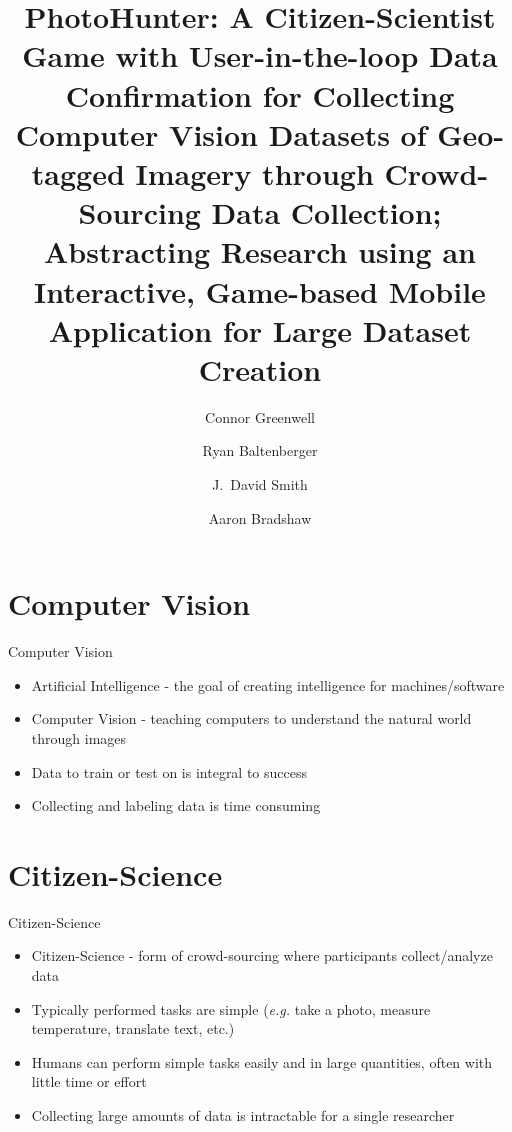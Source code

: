 \documentclass[aspectratio=169]{beamer}
\title[PhotoHunter]{PhotoHunter: A Citizen-Scientist Game with User-in-the-loop 
  Data Confirmation for Collecting Computer Vision Datasets of 
  Geo-tagged Imagery through Crowd-Sourcing Data Collection; 
  Abstracting Research using an Interactive, Game-based Mobile 
  Application for Large Dataset Creation}
\author[]{Connor Greenwell \and Ryan Baltenberger 
  \and J.\ David Smith \and Aaron Bradshaw}
\institute{QuesoTech.com}
\begin{document}
\maketitle

\section{Computer Vision}

\begin{frame}{Computer Vision}
  \begin{itemize}

    \item Artificial Intelligence - the goal of creating intelligence for
          machines/software

    \item Computer Vision - teaching computers to understand the natural world
          through images

    \item Data to train or test on is integral to success

    \item Collecting and labeling data is time consuming

  \end{itemize}
\end{frame}

\section{Citizen-Science}

\begin{frame}{Citizen-Science}
  \begin{itemize}
    
    \item Citizen-Science - form of crowd-sourcing where participants
          collect/analyze data

    \item Typically performed tasks are simple (\textit{e.g.} take a photo,
          measure temperature, translate text, etc.)

    \item Humans can perform simple tasks easily and in large quantities,
          often with little time or effort

    \item Collecting large amounts of data is intractable for a single 
          researcher

  \end{itemize}
\end{frame}
\end{document}
